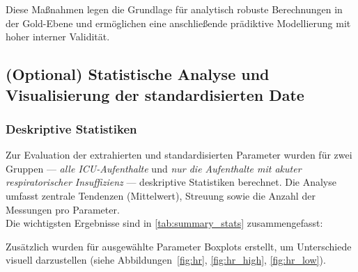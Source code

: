 \documentclass[12pt]{article}
\begin{document}
Diese Maßnahmen legen die Grundlage für analytisch robuste Berechnungen in der Gold-Ebene und ermöglichen eine anschließende prädiktive Modellierung mit hoher interner Validität.

\subsection{(Optional) Statistische Analyse und Visualisierung der standardisierten Date}

\subsubsection{Deskriptive Statistiken}

Zur Evaluation der extrahierten und standardisierten Parameter wurden für zwei Gruppen — \textit{alle ICU-Aufenthalte} und \textit{nur die Aufenthalte mit akuter respiratorischer Insuffizienz} — deskriptive Statistiken berechnet. Die Analyse umfasst zentrale Tendenzen (Mittelwert), Streuung sowie die Anzahl der Messungen pro Parameter.\\

\noindent
Die wichtigsten Ergebnisse sind in \autoref{tab:summary_stats} zusammengefasst:

\begin{table}[htbp]
\centering
\caption{Vergleich zentraler Parameter zwischen Allgemeinpopulation und Kohorte}
\label{tab:summary_stats}
\end{table}


Zusätzlich wurden für ausgewählte Parameter Boxplots erstellt, um Unterschiede visuell darzustellen (siehe Abbildungen~\ref{fig:hr}, \ref{fig:hr_high}, \ref{fig:hr_low}).
\end{document}
